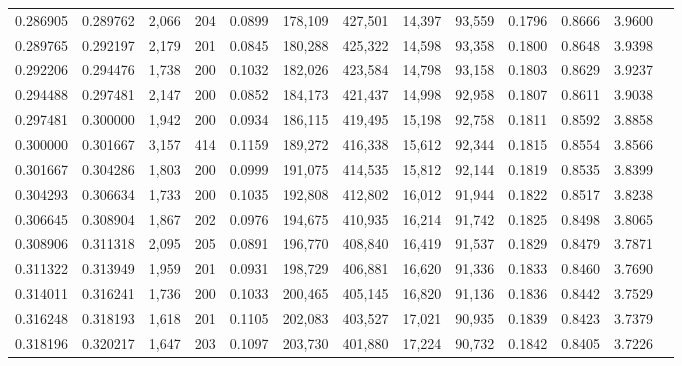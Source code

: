 \begin{tabular}{rrrrrrrrrrrrr}
0.286905 & 0.289762 &  2,066 &   204 &                                     0.0899 & 178,109 & 427,501 &  14,397 &  93,559 & 0.1796 & 0.8666 & 3.9600 \\
0.289765 & 0.292197 &  2,179 &   201 &                                     0.0845 & 180,288 & 425,322 &  14,598 &  93,358 & 0.1800 & 0.8648 & 3.9398 \\
0.292206 & 0.294476 &  1,738 &   200 &                                     0.1032 & 182,026 & 423,584 &  14,798 &  93,158 & 0.1803 & 0.8629 & 3.9237 \\
0.294488 & 0.297481 &  2,147 &   200 &                                     0.0852 & 184,173 & 421,437 &  14,998 &  92,958 & 0.1807 & 0.8611 & 3.9038 \\
0.297481 & 0.300000 &  1,942 &   200 &                                     0.0934 & 186,115 & 419,495 &  15,198 &  92,758 & 0.1811 & 0.8592 & 3.8858 \\
0.300000 & 0.301667 &  3,157 &   414 &                                     0.1159 & 189,272 & 416,338 &  15,612 &  92,344 & 0.1815 & 0.8554 & 3.8566 \\
0.301667 & 0.304286 &  1,803 &   200 &                                     0.0999 & 191,075 & 414,535 &  15,812 &  92,144 & 0.1819 & 0.8535 & 3.8399 \\
0.304293 & 0.306634 &  1,733 &   200 &                                     0.1035 & 192,808 & 412,802 &  16,012 &  91,944 & 0.1822 & 0.8517 & 3.8238 \\
0.306645 & 0.308904 &  1,867 &   202 &                                     0.0976 & 194,675 & 410,935 &  16,214 &  91,742 & 0.1825 & 0.8498 & 3.8065 \\
0.308906 & 0.311318 &  2,095 &   205 &                                     0.0891 & 196,770 & 408,840 &  16,419 &  91,537 & 0.1829 & 0.8479 & 3.7871 \\
0.311322 & 0.313949 &  1,959 &   201 &                                     0.0931 & 198,729 & 406,881 &  16,620 &  91,336 & 0.1833 & 0.8460 & 3.7690 \\
0.314011 & 0.316241 &  1,736 &   200 &                                     0.1033 & 200,465 & 405,145 &  16,820 &  91,136 & 0.1836 & 0.8442 & 3.7529 \\
0.316248 & 0.318193 &  1,618 &   201 &                                     0.1105 & 202,083 & 403,527 &  17,021 &  90,935 & 0.1839 & 0.8423 & 3.7379 \\
0.318196 & 0.320217 &  1,647 &   203 &                                     0.1097 & 203,730 & 401,880 &  17,224 &  90,732 & 0.1842 & 0.8405 & 3.7226 \\

\end{tabular}
